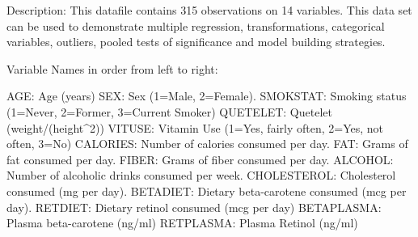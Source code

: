 Description:  This datafile contains 315 observations on 14 variables. 
This data set can be used to demonstrate multiple regression, transformations, categorical variables, outliers, 
pooled tests of significance and model building strategies. 

Variable Names in order from left to right:

	AGE: Age (years)
	SEX: Sex (1=Male, 2=Female).
	SMOKSTAT: Smoking status (1=Never, 2=Former, 3=Current Smoker)
	QUETELET: Quetelet (weight/(height^2))
	VITUSE: Vitamin Use (1=Yes, fairly often, 2=Yes, not often, 3=No)
	CALORIES: Number of calories consumed per day.
	FAT: Grams of fat consumed per day.
	FIBER: Grams of fiber consumed per day.
	ALCOHOL: Number of alcoholic drinks consumed per week.
	CHOLESTEROL: Cholesterol consumed (mg per day).
	BETADIET: Dietary beta-carotene consumed (mcg per day).
	RETDIET: Dietary retinol consumed (mcg per day)
	BETAPLASMA: Plasma beta-carotene (ng/ml)
	RETPLASMA: Plasma Retinol (ng/ml)

